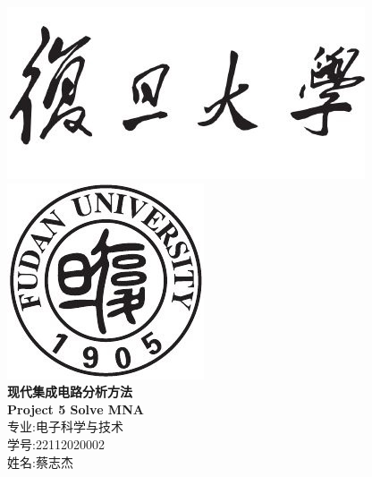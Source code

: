 \documentclass[12pt]{article}
\newcommand{\hmwkTitle}{Project 5 Solve MNA}
\newcommand{\hmwkAuthorName}{姓名:蔡志杰 }
\newcommand{\hmwMajor}{专业:电子科学与技术}
\newcommand{\hmwNumber}{学号:22112020002}
\begin{document}
\begin{sloppypar}

\begin{titlepage}
\begin{center}



\includegraphics[scale = 0.9]{fudan.jpg}\\
\includegraphics[scale = 0.6]{fudan_logo.jpg}\\
\vspace{0.5in}
\linespread{1.9}\huge {\bfseries 现代集成电路分析方法}\\
\linespread{1.9}\LARGE {\bfseries \textbf{\hmwkTitle}}\\
\vspace{1.0in}
\large \hmwMajor{}\\
\large \hmwNumber{}\\
\large \hmwkAuthorName{}\\


\end{center}
\end{titlepage}
\end{sloppypar}
\end{document}

